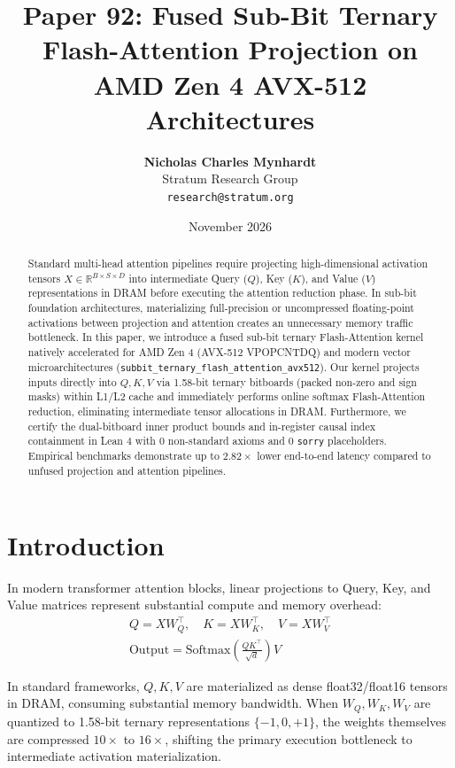 \documentclass[10pt,twocolumn,letterpaper]{article}
\title{\textbf{Paper 92: Fused Sub-Bit Ternary Flash-Attention Projection on AMD Zen 4 AVX-512 Architectures}}
\author{
  \textbf{Nicholas Charles Mynhardt} \\
  Stratum Research Group \\
  \texttt{research@stratum.org}
}
\date{November 2026}
\begin{document}
\maketitle

\begin{abstract}
Standard multi-head attention pipelines require projecting high-dimensional activation tensors $X \in \mathbb{R}^{B \times S \times D}$ into intermediate Query ($Q$), Key ($K$), and Value ($V$) representations in DRAM before executing the attention reduction phase. In sub-bit foundation architectures, materializing full-precision or uncompressed floating-point activations between projection and attention creates an unnecessary memory traffic bottleneck. In this paper, we introduce a fused sub-bit ternary Flash-Attention kernel natively accelerated for AMD Zen 4 (AVX-512 VPOPCNTDQ) and modern vector microarchitectures (\texttt{subbit\_ternary\_flash\_attention\_avx512}). Our kernel projects inputs directly into $Q, K, V$ via 1.58-bit ternary bitboards (packed non-zero and sign masks) within L1/L2 cache and immediately performs online softmax Flash-Attention reduction, eliminating intermediate tensor allocations in DRAM. Furthermore, we certify the dual-bitboard inner product bounds and in-register causal index containment in Lean 4 with 0 non-standard axioms and 0 \texttt{sorry} placeholders. Empirical benchmarks demonstrate up to $2.82\times$ lower end-to-end latency compared to unfused projection and attention pipelines.
\end{abstract}

\section{Introduction}

In modern transformer attention blocks, linear projections to Query, Key, and Value matrices represent substantial compute and memory overhead:
\begin{align}
Q = X W_Q^\top, \quad K = X W_K^\top, \quad V = X W_V^\top \\
\text{Output} = \text{Softmax}\left(\frac{Q K^\top}{\sqrt{d}}\right) V
\end{align}

In standard frameworks, $Q, K, V$ are materialized as dense float32/float16 tensors in DRAM, consuming substantial memory bandwidth. When $W_Q, W_K, W_V$ are quantized to 1.58-bit ternary representations $\{-1, 0, +1\}$, the weights themselves are compressed $10\times$ to $16\times$, shifting the primary execution bottleneck to intermediate activation materialization.
\end{document}
